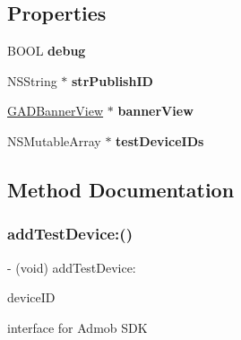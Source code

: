 \subsection*{Properties}
\begin{DoxyCompactItemize}
\item 
\mbox{\label{interfaceAdsAdmob_a8c337c64609a6129a6da81711a6501e5}} 
B\+O\+OL {\bfseries debug}
\item 
\mbox{\label{interfaceAdsAdmob_a842589610c46f7309bd64796c5899a26}} 
N\+S\+String $\ast$ {\bfseries str\+Publish\+ID}
\item 
\mbox{\label{interfaceAdsAdmob_a4d23ccb1382461ea65c67e9178b1c873}} 
\hyperlink{interfaceGADBannerView}{G\+A\+D\+Banner\+View} $\ast$ {\bfseries banner\+View}
\item 
\mbox{\label{interfaceAdsAdmob_a122aa11f50c40c10873bd7c74ab514fa}} 
N\+S\+Mutable\+Array $\ast$ {\bfseries test\+Device\+I\+Ds}
\end{DoxyCompactItemize}


\subsection{Method Documentation}
\mbox{\label{interfaceAdsAdmob_a631fa04a8406d457cbbdaf31bde7d895}} 
\subsubsection{\texorpdfstring{add\+Test\+Device\+:()}{addTestDevice:()}}
{\footnotesize\ttfamily -\/ (void) add\+Test\+Device\+: \begin{DoxyParamCaption}\item[{(N\+S\+String$\ast$)}]{device\+ID }\end{DoxyParamCaption}}

interface for Admob S\+DK \mbox{\label{interfaceAdsAdmob_a636eafaed5d30852f70d47247231293e}} 
